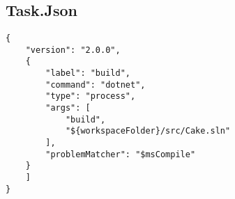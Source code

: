 

\chapter{}
\section{Task.Json}
\label{b:taskJson}

\begin{verbatim}
{
    "version": "2.0.0",
    {
        "label": "build",
        "command": "dotnet",
        "type": "process",
        "args": [
            "build",
            "${workspaceFolder}/src/Cake.sln"
        ],
        "problemMatcher": "$msCompile"
    }
    ]
}    
\end{verbatim}